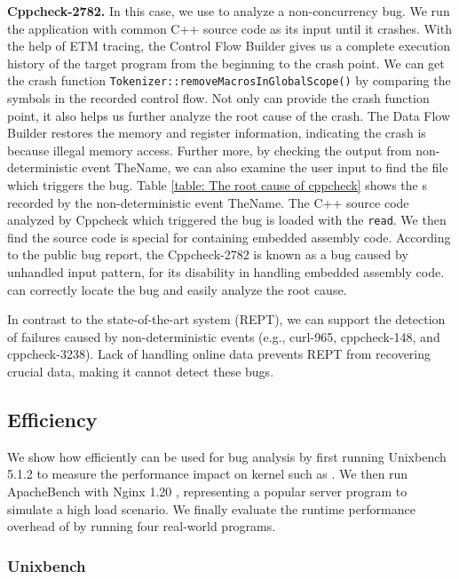 \textbf{Cppcheck-2782.} In this case, we use \TheName to analyze a
non-concurrency bug. We run the application with common C++ source code as its
input until it crashes. With the help of ETM tracing, the Control Flow Builder
gives us a complete execution history of the target program from the beginning
to the crash point. We can get the crash function
\texttt{Tokenizer::removeMacrosInGlobalSco\-pe()} by comparing the symbols in the
recorded control flow. Not only can \TheName provide the crash function point,
it also helps us further analyze the root cause of the crash. The Data Flow
Builder restores the memory and register information, indicating the crash is
because illegal memory access. Further more, by checking the output from
non-deterministic event TheName, we can also examine the user input to find the
file which triggers the bug. Table \ref{table: The root cause of cppcheck} shows
the \syscall{}s recorded by the non-deterministic event TheName. The C++ source
code analyzed by Cppcheck which triggered the bug is loaded with the \syscall{}
\texttt{read}. We then find the source code is special for containing embedded
assembly code. According to the public bug report, the Cppcheck-2782 is known as
a bug caused by unhandled input pattern, for its disability in handling embedded
assembly code. \TheName can correctly locate the bug and easily analyze the root
cause.

In contrast to the state-of-the-art system (REPT), we can support the detection of
failures caused by non-deterministic events (e.g., curl-965, cppcheck-148, and
cppcheck-3238). Lack of handling online data prevents REPT from recovering
crucial data, making it cannot detect these bugs.


\subsection{Efficiency} \label{subsec:eva-Efficiency}

We show how efficiently \TheName can be used for bug analysis by first running
Unixbench 5.1.2 \cite{unixbench} to measure the performance impact on kernel
such as \syscall{}. We then run ApacheBench \cite{ApacheBench} with Nginx 1.20
\cite{nginx_1.20.0}, representing a popular server program to simulate a high load
scenario. We finally evaluate the runtime performance overhead of \TheName by running four real-world programs.

\subsubsection{Unixbench} \label{subsec:eva-Performance-Unixbench}

